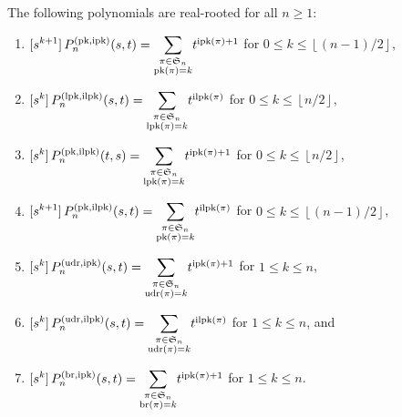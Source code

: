 \begin{conjecture}
\label{c-rr}The following polynomials are real-rooted for all $n\geq1$:
\begin{enumerate}
\item [\normalfont{(a)}] ${\displaystyle [s^{k+1}]\,P_{n}^{(\operatorname{pk},\operatorname{ipk})}(s,t)=\sum_{\substack{\pi\in\mathfrak{S}_{n}\\
\operatorname{pk}(\pi)=k
}
}}t^{\operatorname{ipk}(\pi)+1}$ for  $0\leq k\leq\left\lfloor (n-1)/2\right\rfloor $,
\item [\normalfont{(b)}] ${\displaystyle [s^{k}]\,P_{n}^{(\operatorname{lpk},\operatorname{ilpk})}(s,t)=\sum_{\substack{\pi\in\mathfrak{S}_{n}\\
\operatorname{lpk}(\pi)=k
}
}}t^{\operatorname{ilpk}(\pi)}$ for  $0\leq k\leq\left\lfloor n/2\right\rfloor $,
\item [\normalfont{(c)}] ${\displaystyle [s^{k}]\,P_{n}^{(\operatorname{pk},\operatorname{ilpk})}(t,s)=\sum_{\substack{\pi\in\mathfrak{S}_{n}\\
\operatorname{lpk}(\pi)=k
}
}}t^{\operatorname{ipk}(\pi)+1}$ for  $0\leq k\leq\left\lfloor n/2\right\rfloor $,
\item [\normalfont{(d)}] ${\displaystyle [s^{k+1}]\,P_{n}^{(\operatorname{pk},\operatorname{ilpk})}(s,t)=\sum_{\substack{\pi\in\mathfrak{S}_{n}\\
\operatorname{pk}(\pi)=k
}
}}t^{\operatorname{ilpk}(\pi)}$ for  $0\leq k\leq\left\lfloor (n-1)/2\right\rfloor $,
\item [\normalfont{(e)}] ${\displaystyle [s^{k}]\,P_{n}^{(\operatorname{udr},\operatorname{ipk})}(s,t)=\sum_{\substack{\pi\in\mathfrak{S}_{n}\\
\operatorname{udr}(\pi)=k
}
}}t^{\operatorname{ipk}(\pi)+1}$ for  $1\leq k\leq n$,
\item [\normalfont{(f)}] ${\displaystyle [s^{k}]\,P_{n}^{(\operatorname{udr},\operatorname{ilpk})}(s,t)=\sum_{\substack{\pi\in\mathfrak{S}_{n}\\
\operatorname{udr}(\pi)=k
}
}}t^{\operatorname{ilpk}(\pi)}$ for  $1\leq k\leq n$, and
\item [\normalfont{(g)}] ${\displaystyle [s^{k}]\,P_{n}^{(\operatorname{br},\operatorname{ipk})}(s,t)=\sum_{\substack{\pi\in\mathfrak{S}_{n}\\
\operatorname{br}(\pi)=k
}
}}t^{\operatorname{ipk}(\pi)+1}$ for  $1\leq k\leq n$.
\end{enumerate}
\end{conjecture}
